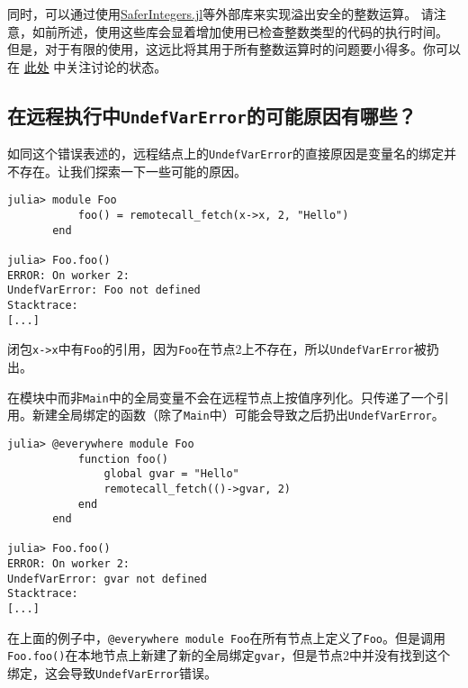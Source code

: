 同时，可以通过使用\href{https://github.com/JeffreySarnoff/SaferIntegers.jl}{SaferIntegers.jl}等外部库来实现溢出安全的整数运算。 请注意，如前所述，使用这些库会显着增加使用已检查整数类型的代码的执行时间。 但是，对于有限的使用，这远比将其用于所有整数运算时的问题要小得多。你可以在 \href{https://github.com/JuliaLang/julia/issues/855}{此处} 中关注讨论的状态。



\hypertarget{15127813284498705272}{}


\subsection{在远程执行中\texttt{UndefVarError}的可能原因有哪些？}



如同这个错误表述的，远程结点上的\texttt{UndefVarError}的直接原因是变量名的绑定并不存在。让我们探索一下一些可能的原因。




\begin{verbatim}
julia> module Foo
           foo() = remotecall_fetch(x->x, 2, "Hello")
       end

julia> Foo.foo()
ERROR: On worker 2:
UndefVarError: Foo not defined
Stacktrace:
[...]
\end{verbatim}



闭包\texttt{x->x}中有\texttt{Foo}的引用，因为\texttt{Foo}在节点2上不存在，所以\texttt{UndefVarError}被扔出。



在模块中而非\texttt{Main}中的全局变量不会在远程节点上按值序列化。只传递了一个引用。新建全局绑定的函数（除了\texttt{Main}中）可能会导致之后扔出\texttt{UndefVarError}。




\begin{verbatim}
julia> @everywhere module Foo
           function foo()
               global gvar = "Hello"
               remotecall_fetch(()->gvar, 2)
           end
       end

julia> Foo.foo()
ERROR: On worker 2:
UndefVarError: gvar not defined
Stacktrace:
[...]
\end{verbatim}



在上面的例子中，\texttt{@everywhere module Foo}在所有节点上定义了\texttt{Foo}。但是调用\texttt{Foo.foo()}在本地节点上新建了新的全局绑定\texttt{gvar}，但是节点2中并没有找到这个绑定，这会导致\texttt{UndefVarError}错误。



